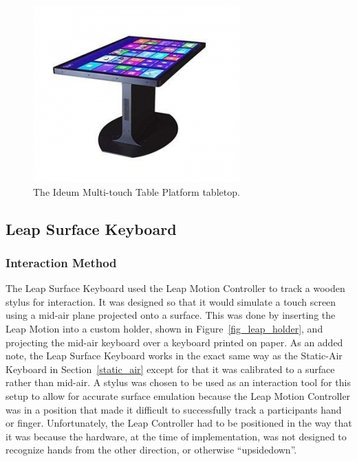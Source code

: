 \begin{figure}[h]
	\centering
	\includegraphics{fig_ideum}
	\caption[Ideum Multi-touch Table Platform]{The Ideum Multi-touch Table Platform tabletop.}
	\label{fig_ideum}
\end{figure}

\subsection{Leap Surface Keyboard} \label{leap_surface}
\subsubsection{Interaction Method}
The Leap Surface Keyboard used the Leap Motion Controller to track a wooden stylus for interaction. It was designed so that it would simulate a touch screen using a mid-air plane projected onto a surface. This was done by inserting the Leap Motion into a custom holder, shown in Figure~\ref{fig_leap_holder}, and projecting the mid-air keyboard over a keyboard printed on paper. As an added note, the Leap Surface Keyboard works in the exact same way as the Static-Air Keyboard in Section~\ref{static_air} except for that it was calibrated to a surface rather than mid-air. A stylus was chosen to be used as an interaction tool for this setup to allow for accurate surface emulation because the Leap Motion Controller was in a position that made it difficult to successfully track a participants hand or finger. Unfortunately, the Leap Controller had to be positioned in the way that it was because the hardware, at the time of implementation, was not designed to recognize hands from the other direction, or otherwise ``upsidedown''.

